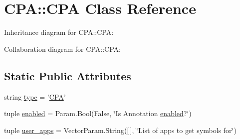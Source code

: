 \hypertarget{classCPA_1_1CPA}{
\section{CPA::CPA Class Reference}
\label{classCPA_1_1CPA}
}


Inheritance diagram for CPA::CPA:


Collaboration diagram for CPA::CPA:
\subsection*{Static Public Attributes}
\begin{DoxyCompactItemize}
\item 
string \hyperlink{classCPA_1_1CPA_acdfeaa8a4e65e395f0625cbb0003d6d9}{type} = '\hyperlink{classCPA_1_1CPA}{CPA}'
\item 
tuple \hyperlink{classCPA_1_1CPA_aa51fc369b2c6374a7e8528ebcefebad8}{enabled} = Param.Bool(False, \char`\"{}Is Annotation \hyperlink{classCPA_1_1CPA_aa51fc369b2c6374a7e8528ebcefebad8}{enabled}?\char`\"{})
\item 
tuple \hyperlink{classCPA_1_1CPA_a81ba328a54b3af6462493b928a9656f5}{user\_\-apps} = VectorParam.String(\mbox{[}$\,$\mbox{]}, \char`\"{}List of apps to get symbols for\char`\"{})
\end{DoxyCompactItemize}


